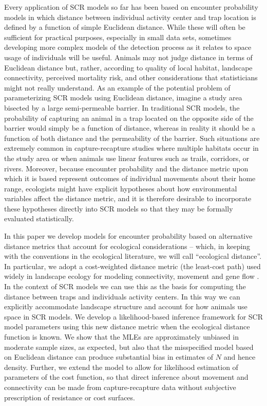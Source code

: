 \documentclass[12pt]{article}
\begin{document}
\begin{spacing}{1.8}
Every application of SCR models so far has been based on encounter
probability models in which distance between individual activity
center and trap location is defined by a function of simple Euclidean
distance.  While these will often be sufficient for practical
purposes, especially in small data sets, sometimes developing more
complex models of the detection process as it relates to space usage
of individuals will be useful.  Animals may not judge distance in
terms of Euclidean distance but, rather, according to quality of local
habitat, landscape connectivity, perceived mortality risk, and other
considerations that statisticians might not really
understand.
As an example of the potential problem of parameterizing SCR models
using Euclidean distance, imagine a study area bisected by a large
semi-permeable barrier. In traditional SCR models, the probability of
capturing an animal in a trap located on the opposite side of the
barrier would simply be a function of distance, whereas in reality it
should be a function of both distance and the permeability of the
barrier. Such situations are extremely common in capture-recapture
studies where multiple habitats occur in the study area or when
animals use linear features such as trails, corridors, or rivers.
 Moreover, because encounter probability and the distance
metric upon which it is based represent outcomes of individual
movements about their home range, ecologists might have explicit
hypotheses about how environmental variables affect the distance
metric, and it is therefore desirable to incorporate these hypotheses
directly into SCR models so that they may be formally evaluated
statistically.




In this paper we develop models for encounter probability based on
alternative distance metrics that account for ecological
considerations -- which, in keeping with the conventions in the
ecological literature, we will call ``ecological distance''. In
particular, we adopt a cost-weighted distance metric (the least-cost path)
used widely in landscape ecology for modeling connectivity,
movement and gene flow
\citep{adriaensen_etal:2003,manel_etal:2003,mcrae_etal:2008}. In the
context of SCR models we can use this as the basis for computing the
distance between traps and individuals activity centers. In this way
we can explicitly accommodate landscape structure and
account for how animals use space in SCR models. We develop a
likelihood-based inference framework for SCR model parameters using
this new distance metric when the ecological distance function is
known.  We show that the MLEs are approximately unbiased in moderate
sample sizes, as expected, but also that the misspecified model based
on Euclidean distance can produce substantial bias in estimates of $N$
and hence density.  Further, we extend the model to allow for likelihood
estimation of parameters of the cost function, so that direct inference
about movement and connectivity can be made from capture-recapture data without subjective prescription
of resistance or cost surfaces.



\end{spacing}
\end{document}
